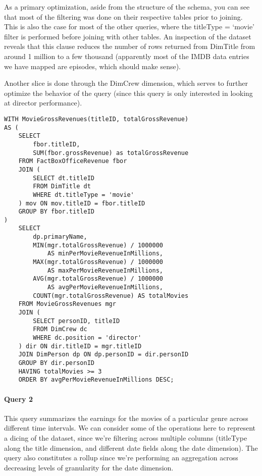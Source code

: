 As a primary optimization, aside from the structure of the schema, you can see that most of the filtering was done on their respective tables prior to joining. This is also the case for most of the other queries, where the titleType = ‘movie’ filter is performed before joining with other tables. An inspection of the dataset reveals that this clause reduces the number of rows returned from DimTitle from around 1 million to a few thousand (apparently most of the IMDB data entries we have mapped are episodes, which should make sense).

Another slice is done through the DimCrew dimension, which serves to further optimize the behavior of the query (since this query is only interested in looking at director performance).

\begin{lstlisting}
WITH MovieGrossRevenues(titleID, totalGrossRevenue) 
AS (
    SELECT 
        fbor.titleID, 
        SUM(fbor.grossRevenue) as totalGrossRevenue
    FROM FactBoxOfficeRevenue fbor
    JOIN ( 
        SELECT dt.titleID
        FROM DimTitle dt
        WHERE dt.titleType = 'movie'
    ) mov ON mov.titleID = fbor.titleID
    GROUP BY fbor.titleID
)
    SELECT 
        dp.primaryName, 
        MIN(mgr.totalGrossRevenue) / 1000000 
            AS minPerMovieRevenueInMillions, 
        MAX(mgr.totalGrossRevenue) / 1000000 
            AS maxPerMovieRevenueInMillions, 
        AVG(mgr.totalGrossRevenue) / 1000000 
            AS avgPerMovieRevenueInMillions, 
        COUNT(mgr.totalGrossRevenue) AS totalMovies
    FROM MovieGrossRevenues mgr
    JOIN (
        SELECT personID, titleID
        FROM DimCrew dc
        WHERE dc.position = 'director'
    ) dir ON dir.titleID = mgr.titleID
    JOIN DimPerson dp ON dp.personID = dir.personID
    GROUP BY dir.personID
    HAVING totalMovies >= 3
    ORDER BY avgPerMovieRevenueInMillions DESC;
\end{lstlisting}

\paragraph{Query 2}
This query summarizes the earnings for the movies of a particular genre across different time intervals. We can consider some of the operations here to represent a dicing of the dataset, since we’re filtering across multiple columns (titleType along the title dimension, and different date fields along the date dimension). The query also constitutes a rollup since we’re performing an aggregation across decreasing levels of granularity for the date dimension.

